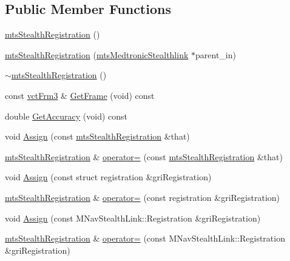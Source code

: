 \subsection*{Public Member Functions}
\begin{DoxyCompactItemize}
\item 
\hyperlink{classmts_stealth_registration_a81080c46af0e98d66301faf0d50df7a9}{mts\+Stealth\+Registration} ()
\item 
\hyperlink{classmts_stealth_registration_a738984308970d3848c9dd5b0252fa778}{mts\+Stealth\+Registration} (\hyperlink{classmts_medtronic_stealthlink}{mts\+Medtronic\+Stealthlink} $\ast$parent\+\_\+in)
\item 
\hyperlink{classmts_stealth_registration_aa67f68f1a4b561db0048bfefc8390809}{$\sim$mts\+Stealth\+Registration} ()
\item 
const \hyperlink{vct_transformation_types_8h_a81feda0a02c2d1bc26e5553f409fed20}{vct\+Frm3} \& \hyperlink{classmts_stealth_registration_a1fe277744997a3d145d9c6afad0e5efa}{Get\+Frame} (void) const 
\item 
double \hyperlink{classmts_stealth_registration_ab0b636a72eb2f9875dde6e3bb1718588}{Get\+Accuracy} (void) const 
\item 
void \hyperlink{classmts_stealth_registration_af5edb0d59e648c60ebf86059a95c271b}{Assign} (const \hyperlink{classmts_stealth_registration}{mts\+Stealth\+Registration} \&that)
\item 
\hyperlink{classmts_stealth_registration}{mts\+Stealth\+Registration} \& \hyperlink{classmts_stealth_registration_a5b1b6941aa8d5dd181bc3f2228563033}{operator=} (const \hyperlink{classmts_stealth_registration}{mts\+Stealth\+Registration} \&that)
\item 
void \hyperlink{classmts_stealth_registration_af865efe13c402e2d1791bfa7cdcea0a8}{Assign} (const struct registration \&gri\+Registration)
\item 
\hyperlink{classmts_stealth_registration}{mts\+Stealth\+Registration} \& \hyperlink{classmts_stealth_registration_ad2750b56f0c2164e6537f2bc54215366}{operator=} (const registration \&gri\+Registration)
\item 
void \hyperlink{classmts_stealth_registration_a947218de69c47685ed23fd9d33f9211b}{Assign} (const M\+Nav\+Stealth\+Link\+::\+Registration \&gri\+Registration)
\item 
\hyperlink{classmts_stealth_registration}{mts\+Stealth\+Registration} \& \hyperlink{classmts_stealth_registration_a40b55f90ec7cffe938e238b9a35b1b03}{operator=} (const M\+Nav\+Stealth\+Link\+::\+Registration \&gri\+Registration)

\end{DoxyCompactItemize}
